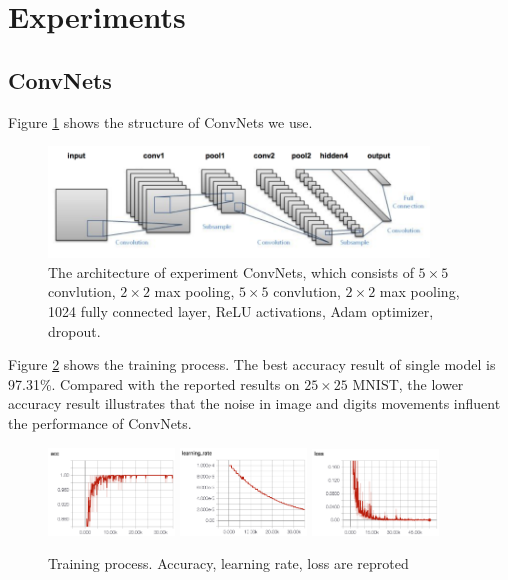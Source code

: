 \documentclass{article} %
\begin{document}
\section{Experiments}
\subsection{ConvNets}
Figure \ref{fig:excnn} shows the structure of ConvNets we use. 
\begin{figure}[htbp]
	\centering
	\includegraphics[width=0.9\textwidth]{figs/cnn.png}
	\caption{The architecture of experiment ConvNets, which consists of $5\times5$ convlution, $2\times2$ max pooling, $5\times5$ convlution, $2\times2$ max pooling, 1024 fully connected layer,  ReLU activations, Adam optimizer, dropout.}
	\label{fig:excnn}
\end{figure}
Figure \ref{fig:process} shows the training process. The best accuracy result of single model is 97.31\%. Compared with the reported results on $25\times25$ MNIST, the lower accuracy result illustrates that the noise in image and digits movements influent the performance of ConvNets. 
\begin{figure}[htbp]
	\centering
	\includegraphics[width=0.3\textwidth]{figs/acc.png}
	\includegraphics[width=0.3\textwidth]{figs/lr.png}
	\includegraphics[width=0.3\textwidth]{figs/loss.png}
	\caption{Training process. Accuracy, learning rate, loss are reproted}
	\label{fig:process}
\end{figure}
\end{document}
